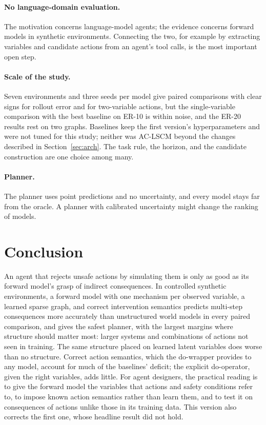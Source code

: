 \paragraph{No language-domain evaluation.}
The motivation concerns language-model agents; the evidence concerns forward
models in synthetic environments. Connecting the two, for example by
extracting variables and candidate actions from an agent's tool calls, is the
most important open step.

\paragraph{Scale of the study.}
Seven environments and three seeds per model give paired comparisons with
clear signs for rollout error and for two-variable actions, but the
single-variable comparison with the best baseline on ER-10 is within noise,
and the ER-20 results rest on two graphs. Baselines keep the first version's
hyperparameters and were not tuned for this study; neither was AC-LSCM beyond
the changes described in Section~\ref{sec:arch}. The task rule, the horizon,
and the candidate construction are one choice among many.

\paragraph{Planner.}
The planner uses point predictions and no uncertainty, and every model stays
far from the oracle. A planner with calibrated uncertainty might change the
ranking of models.

\section{Conclusion}

An agent that rejects unsafe actions by simulating them is only as good as
its forward model's grasp of indirect consequences. In controlled synthetic
environments, a forward model with one mechanism per observed variable, a
learned sparse graph, and correct intervention semantics predicts multi-step
consequences more accurately than unstructured world models in every paired
comparison, and gives the safest planner, with the largest margins where
structure should matter most: larger systems and combinations of actions not
seen in training. The same structure placed on learned latent variables does
worse than no structure. Correct action semantics, which the do-wrapper
provides to any model, account for much of the baselines' deficit; the
explicit do-operator, given the right variables, adds little. For agent
designers, the practical reading is to give the forward model the variables
that actions and safety conditions refer to, to impose known action
semantics rather than learn them, and to test it on consequences of actions
unlike those in its training data. This version also corrects the first one,
whose headline result did not hold.

